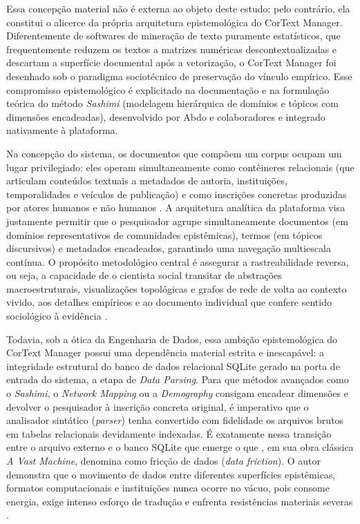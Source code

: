 \documentclass[
	oneside,
	a4paper,
	12pt,
	chapter=TITLE,
	section=TITLE,
	english,
	brazilian
]{abntex2}
\begin{document}
Essa concepção material não é externa ao objeto deste estudo; pelo contrário, ela constitui o alicerce da própria arquitetura epistemológica do CorText Manager. Diferentemente de softwares de mineração de texto puramente estatísticos, que frequentemente reduzem os textos a matrizes numéricas descontextualizadas e descartam a superfície documental após a vetorização, o CorText Manager foi desenhado sob o paradigma sociotécnico de preservação do vínculo empírico. Esse compromisso epistemológico é explicitado na documentação e na formulação teórica do método \textit{Sashimi} (modelagem hierárquica de domínios e tópicos com dimensões encadeadas), desenvolvido por Abdo e colaboradores \cite{Abdo2021} e integrado nativamente à plataforma.

Na concepção do sistema, os documentos que compõem um corpus ocupam um lugar privilegiado: eles operam simultaneamente como contêineres relacionais (que articulam conteúdos textuais a metadados de autoria, instituições, temporalidades e veículos de publicação) e como inscrições concretas produzidas por atores humanos e não humanos \cite{Abdo2021}. A arquitetura analítica da plataforma visa justamente permitir que o pesquisador agrupe simultaneamente documentos (em domínios representativos de comunidades epistêmicas), termos (em tópicos discursivos) e metadados encadeados, garantindo uma navegação multiescala contínua. O propósito metodológico central é assegurar a rastreabilidade reversa, ou seja, a capacidade de o cientista social transitar de abstrações macroestruturais, visualizações topológicas e grafos de rede de volta ao contexto vivido, aos detalhes empíricos e ao documento individual que confere sentido sociológico à evidência \cite{Abdo2021}.

Todavia, sob a ótica da Engenharia de Dados, essa ambição epistemológica do CorText Manager possui uma dependência material estrita e inescapável: a integridade estrutural do banco de dados relacional SQLite gerado na porta de entrada do sistema, a etapa de \textit{Data Parsing}. Para que métodos avançados como o \textit{Sashimi}, o \textit{Network Mapping} ou a \textit{Demography} consigam encadear dimensões e devolver o pesquisador à inscrição concreta original, é imperativo que o analisador sintático (\textit{parser}) tenha convertido com fidelidade os arquivos brutos em tabelas relacionais devidamente indexadas. É exatamente nessa transição entre o arquivo externo e o banco SQLite que emerge o que , em sua obra clássica \textit{A Vast Machine}, denomina como fricção de dados (\textit{data friction}). O autor demonstra que o movimento de dados entre diferentes superfícies epistêmicas, formatos computacionais e instituições nunca ocorre no vácuo, pois consome energia, exige intenso esforço de tradução e enfrenta resistências materiais severas \cite{Edwards2010}.
\end{document}
